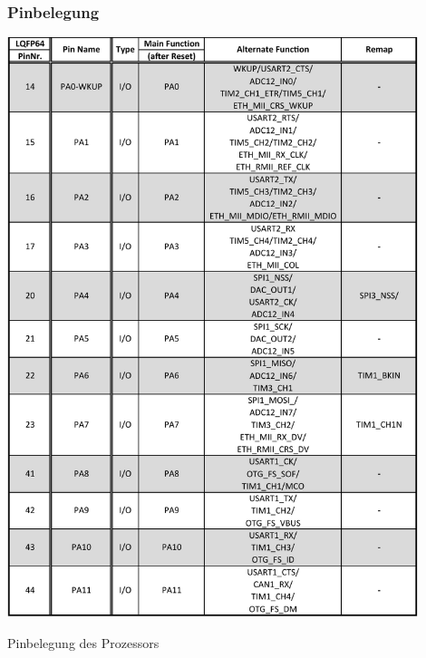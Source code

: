 \subsubsection{Pinbelegung}
\begin{table}[H]
    \centering
    \includegraphics[width=0.9\textwidth]{Schuh/Pictures/Pinbelegung1}
    \caption[Pinbelegung des Prozessors]{Pinbelegung des Prozessors \cite{stm:stm32f107rc}}
    \label{tab:coremodul-cpupins}
\end{table}
